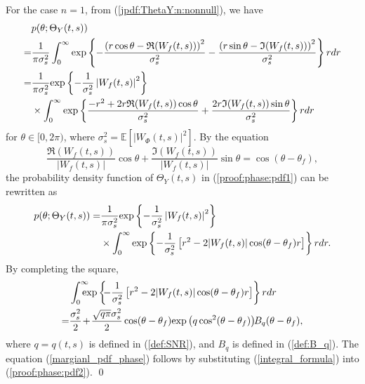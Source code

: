 \documentclass{amsart}
\begin{document}
For the case $n=1$, from (\ref{jpdf:ThetaY:n:nonnull}), we have
\begin{align}\label{proof:phase:pdf1}
&p(\theta;\Theta_{Y}(t,s))
\\\notag=&\frac{1}{\pi \sigma_{s}^{2}}\int_{0}^{\infty}\textup{exp}
\left\{-\frac{\left(r\cos\theta-\mathfrak{R}(W_{f}(t,s))\right)^{2}
}{\sigma_{s}^{2}}
-\frac{\left(r\sin\theta-\mathfrak{I}(W_{f}(t,s))\right)^{2}}{\sigma_{s}^{2}}
\right\}rdr
\\\notag=&\frac{1}{\pi \sigma_{s}^{2}}\textup{exp}\left\{-\frac{1}{\sigma_{s}^{2}}\left|W_{f}(t,s)\right|^{2}\right\}
\\\notag&\times\int_{0}^{\infty}\textup{exp}\left\{\frac{-r^2+2r\mathfrak{R}(W_{f}(t,s))\cos\theta}{\sigma_{s}^{2}}
+\frac{2r\mathfrak{I}(W_{f}(t,s))\sin\theta}{\sigma_{s}^{2}}\right\}rdr
\end{align}
for $\theta\in [0,2\pi)$, where $\sigma^{2}_{s} = \mathbb{E}[|W_{\Phi}(t,s)|^{2}]$.
By the equation
\begin{equation*}%
\frac{\mathfrak{R}(W_{f}(t,s))}{|W_{f}(t,s)|}\cos\theta
 +\frac{\mathfrak{I}(W_{f}(t,s))}{|W_{f}(t,s)|}\sin\theta
 =\cos\left(\theta-\theta_{f}\right),
\end{equation*}
the probability density function of $\Theta_{Y}(t,s)$ in (\ref{proof:phase:pdf1})  can be rewritten as
\begin{align}\label{proof:phase:pdf2}
p(\theta;\Theta_{Y}(t,s))
=&\frac{1}{\pi \sigma_{s}^{2}}\textup{exp}\left\{-\frac{1}{\sigma_{s}^{2}}\left|W_{f}(t,s)\right|^{2}\right\}
\\\notag&\times\int_{0}^{\infty}\textup{exp}\left\{-\frac{1}{\sigma_{s}^{2}}
\left[r^2-2|W_{f}(t,s)|\cos(\theta-\theta_{f})r\right]\right\}rdr.
\end{align}
By completing the square,
\begin{align}\label{integral_formula}
&\int_{0}^{\infty}\hspace{-0.3cm}\textup{exp}\left\{\hspace{-0.1cm}-\frac{1}{\sigma_{s}^{2}}\left[r^2-2|W_{f}(t,s)|\cos(\theta-\theta_{f})r\right]\right\}rdr
 \\\notag=&\frac{\sigma_{s}^{2}}{2}\hspace{-0.05cm}+\hspace{-0.05cm}\frac{\sqrt{q\pi}\sigma_{s}^{2}}{2}
\cos(\theta-\theta_{f}) \textup{exp}\left(q\cos^{2}(\theta-\theta_{f})\right)
\hspace{-0.1cm}B_{q}(\theta-\theta_{f}),
\end{align}
where $q=q(t,s)$ is defined in (\ref{def:SNR}), and $B_{q}$ is defined in (\ref{def:B_q}).
The equation (\ref{margianl_pdf_phase}) follows by substituting (\ref{integral_formula}) into (\ref{proof:phase:pdf2}).
\qed
\end{document}
